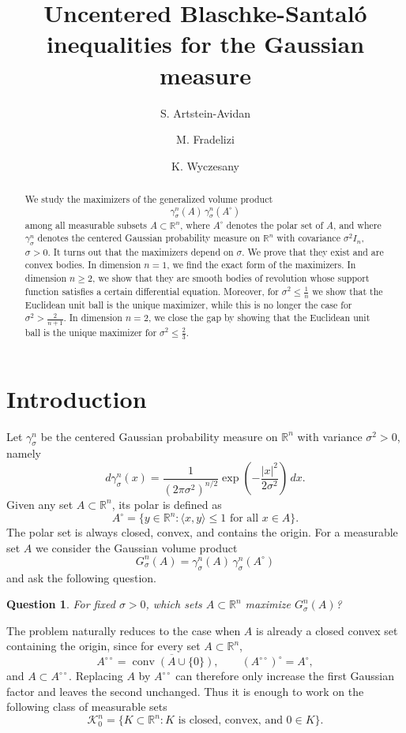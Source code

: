 \documentclass[12pt,oneside,reqno]{amsart}
\title[Uncentered Blaschke-Santal\'o inequalities for the Gaussian measure]{Uncentered Blaschke-Santal\'o inequalities for the Gaussian measure}
\author[S. Artstein-Avidan]{S. Artstein-Avidan}
\author[M. Fradelizi]{M. Fradelizi}
\author[K. Wyczesany]{K. Wyczesany}
\date{}
\numberwithin{equation}{section}
\newtheorem{question}[theorem]{Question}
\theoremstyle{remark}
\newcommand{\R}{\mathbb R}
\newcommand{\dd}{\,d}
\newcommand{\ip}[2]{\langle #1,#2\rangle}
\newcommand{\conv}{\operatorname{conv}}
\def\class{\mathcal{K}^n_0}
\begin{document}
\begin{abstract}
We study the maximizers of the generalized volume product
\[
        \gamma_\sigma^n(A)\,\gamma_\sigma^n(A^\circ)
\]
among all measurable subsets $A\subset\R^n$, where 
$A^\circ$ denotes the polar set of $A$, and where $\gamma_\sigma^n$ denotes the centered Gaussian probability measure on $\R^n$ with covariance $\sigma^2 I_n$, $\sigma>0$.  It turns out that the maximizers depend on $\sigma$.
We prove that they exist and are convex bodies.
In dimension $n=1$, we find the exact form of the maximizers.  
In dimension $n\ge 2$, we show that they are smooth bodies of revolution whose support function satisfies a certain differential equation. 
Moreover, for $\sigma^2 \le \frac{1}{{n}}$ we show that the Euclidean unit ball is the unique maximizer, while this is no longer the case for $\sigma^2> {\frac{2}{n+1}}$. In dimension $n=2$, we close the gap by showing that the Euclidean unit ball is the unique maximizer for $\sigma^2 \le \frac{2}{3}$.
  
 
\end{abstract}

\maketitle

\section{Introduction}

Let $\gamma_\sigma^n$ be the centered Gaussian probability measure on $\R^n$ with variance $\sigma^2>0$, namely
\[
        d\gamma_\sigma^n(x)=\frac{1}{(2\pi\sigma^2)^{n/2}}
        \exp\left(-\frac{|x|^2}{2\sigma^2}\right)\dd x.
\]
Given any set $A\subset\R^n$, its polar is defined as
\[
        A^\circ=\{y\in\R^n:\ip{x}{y}\le1\text{ for all }x\in A\}.
\]
The polar set is always closed, convex, and contains the origin. For a  measurable set $A$ we consider the Gaussian volume product
\begin{equation}\label{eq:Gaussian product}
G^n_\sigma(A)=\gamma_\sigma^n(A)\,\gamma_\sigma^n(A^\circ)
\end{equation}
and ask the following question.

\begin{question}\label{q:main}
For fixed $\sigma>0$, which sets $A\subset\R^n$ maximize $G^n_\sigma(A)$?
\end{question}

The problem naturally reduces to the case when $A$ is already a closed convex set containing the origin, since for every set $A\subset\R^n$,
\[
        A^{\circ\circ}=\overline{\conv(A\cup\{0\})},
        \qquad (A^{\circ\circ})^\circ=A^\circ,
\]
and $A\subset A^{\circ\circ}$. Replacing $A$ by $A^{\circ\circ}$ can therefore only increase the first Gaussian factor and leaves the second unchanged. Thus it is enough to work on the following class of measurable sets
\[
        \class=\{K\subset\R^n:K\text{ is closed, convex, and }0\in K\}.
\]
\end{document}
